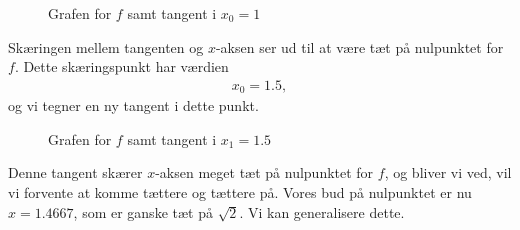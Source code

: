 \begin{figure}[H]
	\centering
	\caption{Grafen for $f$ samt tangent i $x_0=1$}
	\label{fig:parabelmedtangent1}
\end{figure}
Skæringen mellem tangenten og $x$-aksen ser ud til at være tæt på nulpunktet for $f$. Dette skæringspunkt har værdien 
\begin{align*}
	x_0 = 1.5,
\end{align*}
og vi tegner en ny tangent i dette punkt.
\begin{figure}[H]
	\centering
	\caption{Grafen for $f$ samt tangent i $x_1 = 1.5$}
	\label{fig:parabelmedtangent2}
\end{figure}
Denne tangent skærer $x$-aksen meget tæt på nulpunktet for $f$, og bliver vi ved, vil vi forvente at komme tættere og tættere på. Vores bud på nulpunktet er nu $x = 1.4667$, som er ganske tæt på $\sqrt{2}$. Vi kan generalisere dette.

